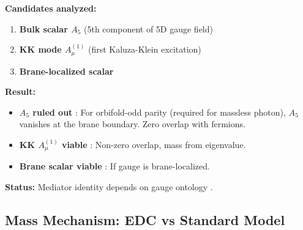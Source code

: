\begin{tcolorbox}[colback=blue!5!white, colframe=blue!50!black,
    title=\textbf{OPR-20a: What Is the Mediator?}]

\textbf{Candidates analyzed:}
\begin{enumerate}[nosep]
\item \textbf{Bulk scalar $A_5$} (5th component of 5D gauge field)
\item \textbf{KK mode $A_\mu^{(1)}$} (first Kaluza-Klein excitation)
\item \textbf{Brane-localized scalar}
\end{enumerate}

\textbf{Result:}
\begin{itemize}[nosep]
\item \textbf{$A_5$ ruled out} \tagDc{}: For orbifold-odd parity (required for massless
      photon), $A_5$ vanishes at the brane boundary. Zero overlap with fermions.
\item \textbf{KK $A_\mu^{(1)}$ viable} \tagP{}: Non-zero overlap, mass from eigenvalue.
\item \textbf{Brane scalar viable} \tagP{}: If gauge is brane-localized.
\end{itemize}

\textbf{Status:} Mediator identity depends on gauge ontology \tagOpen{}.
\end{tcolorbox}

\subsection{Mass Mechanism: EDC vs Standard Model}

